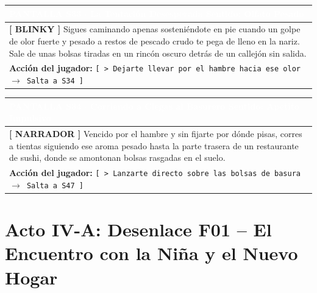 \documentclass[11pt, a4paper]{article}
\begin{document}
\vspace{1em}

\noindent
\begin{tabularx}{\textwidth}{|X|}
\hline
\rowcolor{colorHeader}
\textbf{\textcolor{white}{PANTALLA S33 $\cdot$ La Tentación Desesperada}} \hfill \small\textcolor{white}{Sentido: Olfato Pesado} \\ \hline
\rowcolor{colorTextoBox}
\textbf{\textcolor{colorEmisor}{[ BLINKY ]}} \vspace{0.2em}\newline
Sigues caminando apenas sosteniéndote en pie cuando un golpe de olor fuerte y pesado a restos de pescado crudo te pega de lleno en la nariz. Sale de unas bolsas tiradas en un rincón oscuro detrás de un callejón sin salida. \\ \hline
\rowcolor{colorBotonBox}
\textbf{Acción del jugador:} \newline
\texttt{[ > Dejarte llevar por el hambre hacia ese olor $\rightarrow$ Salta a S34 ]} \\ \hline
\end{tabularx}

\vspace{1em}

\noindent
\begin{tabularx}{\textwidth}{|X|}
\hline
\rowcolor{colorAlerta}
\textbf{\textcolor{white}{PANTALLA S34 $\cdot$ Corriendo a Ciegas al Basurero}} \hfill \small\textcolor{white}{Sentido: Apetito Impulsivo} \\ \hline
\rowcolor{colorTextoBox}
\textbf{\textcolor{colorEmisor}{[ NARRADOR ]}} \vspace{0.2em}\newline
Vencido por el hambre y sin fijarte por dónde pisas, corres a tientas siguiendo ese aroma pesado hasta la parte trasera de un restaurante de sushi, donde se amontonan bolsas rasgadas en el suelo. \\ \hline
\rowcolor{colorBotonBox}
\textbf{Acción del jugador:} \newline
\texttt{[ > Lanzarte directo sobre las bolsas de basura $\rightarrow$ Salta a S47 ]} \\ \hline
\end{tabularx}

\newpage

\section*{Acto IV-A: Desenlace F01 -- El Encuentro con la Niña y el Nuevo Hogar}
\end{document}
